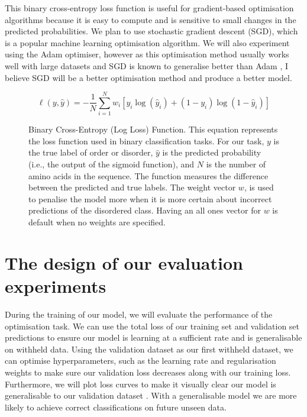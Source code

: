 \documentclass{l4proj}
\begin{document}
This binary cross-entropy loss function is useful for gradient-based optimisation algorithms because it is easy to compute and is sensitive to small changes in the predicted probabilities. We plan to use stochastic gradient descent (SGD), which is a popular machine learning optimisation algorithm. We will also experiment using the Adam optimiser, however as this optimisation method usually works well with large datasets and SGD is known to generalise better than Adam \citep{Zhou:20}, I believe SGD will be a better optimisation method and produce a better model. 

\begin{figure}[h]
    \centering
    \begin{equation}
    \ell(y, \hat{y}) = -\frac{1}{N} \sum_{i=1}^{N} w_i [ y_i \log(\hat{y}_i) + (1-y_i)\log(1-\hat{y}_i)]
    \end{equation}
    \caption{Binary Cross-Entropy (Log Loss) Function. This equation represents the loss function used in binary classification tasks. For our task, $y$ is the true label of order or disorder, $\hat{y}$ is the predicted probability (i.e., the output of the sigmoid function), and $N$ is the number of amino acids in the sequence. The function measures the difference between the predicted and true labels. The weight vector $w$, is used to penalise the model more when it is more certain about incorrect predictions of the disordered class. Having an all ones vector for $w$ is default when no weights are specified.}
    \label{fig:bceloss}
\end{figure}

\section{The design of our evaluation experiments}
\label{chap:design sec:eval}

During the training of our model, we will evaluate the performance of the optimisation task. We can use the total loss of our training set and validation set predictions to ensure our model is learning at a sufficient rate and is generalisable on withheld data. Using the validation dataset as our first withheld dataset, we can optimise hyperparameters, such as the learning rate and regularisation weights to make sure our validation loss decreases along with our training loss. Furthermore, we will plot loss curves to make it visually clear our model is generalisable to our validation dataset \citep{Brownlee:19}. With a generalisable model we are more likely to achieve correct classifications on future unseen data. 
\end{document}
